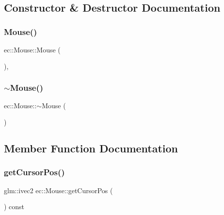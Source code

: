 \subsection{Constructor \& Destructor Documentation}
\mbox{\label{classec_1_1_mouse_ac1154831feadd646ecabad6dc1d42136}} 
\subsubsection{\texorpdfstring{Mouse()}{Mouse()}}
{\footnotesize\ttfamily ec\+::\+Mouse\+::\+Mouse (\begin{DoxyParamCaption}{ }\end{DoxyParamCaption})\hspace{0.3cm}{\ttfamily [explicit]}, {\ttfamily [default]}}

\mbox{\label{classec_1_1_mouse_a49441335e64c7bf098217f0698975aa4}} 
\subsubsection{\texorpdfstring{$\sim$\+Mouse()}{~Mouse()}}
{\footnotesize\ttfamily ec\+::\+Mouse\+::$\sim$\+Mouse (\begin{DoxyParamCaption}{ }\end{DoxyParamCaption})\hspace{0.3cm}{\ttfamily [default]}}



\subsection{Member Function Documentation}
\mbox{\label{classec_1_1_mouse_ac78aee81c618536c76a74852d344128d}} 
\subsubsection{\texorpdfstring{get\+Cursor\+Pos()}{getCursorPos()}}
{\footnotesize\ttfamily glm\+::ivec2 ec\+::\+Mouse\+::get\+Cursor\+Pos (\begin{DoxyParamCaption}{ }\end{DoxyParamCaption}) const}



